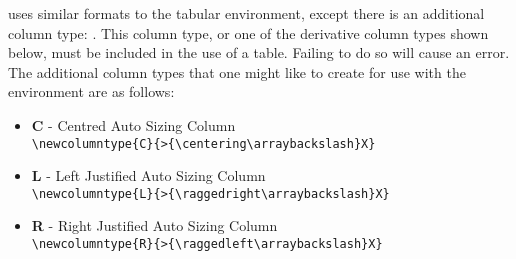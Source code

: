    uses similar formats to the tabular environment, except there is an additional column type: .
  This column type, or one of the derivative column types shown below, must be included in the use of a  table. 
  Failing to do so will cause an error. The additional column types that one might like to create for use with the  environment are as follows:
  \begin{itemize}
    \item \textbf{C} - Centred Auto Sizing Column\\\lstinline|\newcolumntype{C}{>{\centering\arraybackslash}X}|
    \item \textbf{L} - Left Justified Auto Sizing Column \\\lstinline|\newcolumntype{L}{>{\raggedright\arraybackslash}X}|
    \item \textbf{R} - Right Justified Auto Sizing Column \\\lstinline|\newcolumntype{R}{>{\raggedleft\arraybackslash}X}|
  \end{itemize}
  
